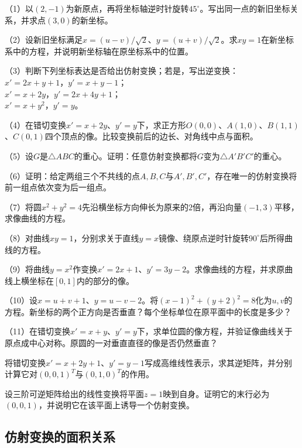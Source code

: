\newpage
\begin{exercise}
\mbox{}

（1）以\((2,-1)\)为新原点，再将坐标轴逆时针旋转\(45^\circ\)。写出同一点的新旧坐标关系，并求点\((3,0)\)的新坐标。

（2）设新旧坐标满足\(x=(u-v)/\sqrt2\)、\(y=(u+v)/\sqrt2\)。求\(xy=1\)在新坐标系中的方程，并说明新坐标轴在原坐标系中的位置。

（3）判断下列坐标表达是否给出仿射变换；若是，写出逆变换：\\
\(x'=2x+y+1\)，\(y'=x+y-1\)；\\
\(x'=x+2y\)，\(y'=2x+4y+1\)；\\
\(x'=x+y^2\)，\(y'=y\)。

（4）在错切变换\(x'=x+2y\)、\(y'=y\)下，求正方形\(O(0,0)\)、\(A(1,0)\)、\(B(1,1)\)、\(C(0,1)\)四个顶点的像。比较变换前后的边长、对角线中点与面积。

（5）设\(G\)是\(\triangle ABC\)的重心。证明：任意仿射变换都将\(G\)变为\(\triangle A'B'C'\)的重心。

（6）证明：给定两组三个不共线的点\(A,B,C\)与\(A',B',C'\)，存在唯一的仿射变换将前一组点依次变为后一组点。

（7）将圆\(x^2+y^2=4\)先沿横坐标方向伸长为原来的\(2\)倍，再沿向量\((-1,3)\)平移，求像曲线的方程。

（8）对曲线\(xy=1\)，分别求关于直线\(y=x\)镜像、绕原点逆时针旋转\(90^\circ\)后所得曲线的方程。

（9）将曲线\(y=x^2\)作变换\(x'=2x+1\)、\(y'=3y-2\)。求像曲线的方程，并求原曲线上横坐标在\([0,1]\)内的部分的像。

（10）设\(x=u+v+1\)、\(y=u-v-2\)。将\((x-1)^2+(y+2)^2=8\)化为\(u,v\)的方程。新坐标的两个正方向是否垂直？每个坐标单位在原平面中的长度是多少？

（11）在错切变换\(x'=x+y\)、\(y'=y\)下，求单位圆的像方程，并验证像曲线关于原点成中心对称。原圆的一对垂直直径的像是否仍然垂直？

将错切变换\(x'=x+2y+1\)、\(y'=y-1\)写成高维线性表示，求其逆矩阵，并分别计算它对\((0,0,1)^T\)与\((0,1,0)^T\)的作用。

设三阶可逆矩阵给出的线性变换将平面\(z=1\)映到自身。证明它的末行必为\((0,0,1)\)，并说明它在该平面上诱导一个仿射变换。
\end{exercise}
\newpage

\subsection{仿射变换的面积关系}
\label{subsec:quadratic-area-relations}

